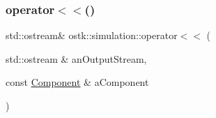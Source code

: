\subsubsection{\texorpdfstring{operator$<$$<$()}{operator<<()}\hspace{0.1cm}{\footnotesize\ttfamily [3/3]}}
{\footnotesize\ttfamily std\+::ostream\& ostk\+::simulation\+::operator$<$$<$ (\begin{DoxyParamCaption}\item[{std\+::ostream \&}]{an\+Output\+Stream,  }\item[{const \hyperlink{classostk_1_1simulation_1_1_component}{Component} \&}]{a\+Component }\end{DoxyParamCaption})}

